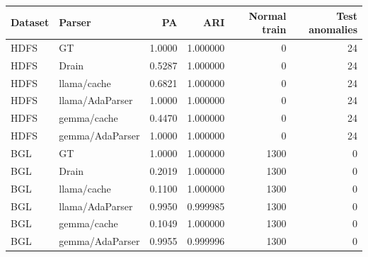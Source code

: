 \begin{tabular}{llrrrr}
\toprule
Dataset & Parser & PA & ARI & Normal train & Test anomalies \\
\midrule
HDFS & GT & 1.0000 & 1.000000 & 0 & 24 \\
HDFS & Drain & 0.5287 & 1.000000 & 0 & 24 \\
HDFS & llama/cache & 0.6821 & 1.000000 & 0 & 24 \\
HDFS & llama/AdaParser & 1.0000 & 1.000000 & 0 & 24 \\
HDFS & gemma/cache & 0.4470 & 1.000000 & 0 & 24 \\
HDFS & gemma/AdaParser & 1.0000 & 1.000000 & 0 & 24 \\
\midrule
BGL & GT & 1.0000 & 1.000000 & 1300 & 0 \\
BGL & Drain & 0.2019 & 1.000000 & 1300 & 0 \\
BGL & llama/cache & 0.1100 & 1.000000 & 1300 & 0 \\
BGL & llama/AdaParser & 0.9950 & 0.999985 & 1300 & 0 \\
BGL & gemma/cache & 0.1049 & 1.000000 & 1300 & 0 \\
BGL & gemma/AdaParser & 0.9955 & 0.999996 & 1300 & 0 \\
\bottomrule
\end{tabular}
